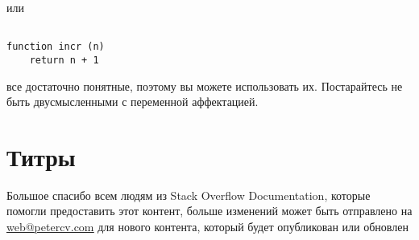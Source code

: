 \vspace{\baselineskip}
или

\vspace{\baselineskip}
\begin{tcolorbox}
\begin{verbatim}

function incr (n)    
	return n + 1

\end{verbatim}
\end{tcolorbox}

все достаточно понятные, поэтому вы можете использовать их. Постарайтесь не быть двусмысленными с переменной аффектацией.

\chapter*{Титры}

\vspace{-0.2cm}
Большое спасибо всем людям из Stack Overflow Documentation, которые помогли предоставить \newline \hspace*{6mm}этот контент, больше изменений может быть отправлено на \href{mailto:web@petercv.com}{\underline{web@petercv.com}} для нового \newline \hspace*{36mm} контента, который будет опубликован или обновлен

